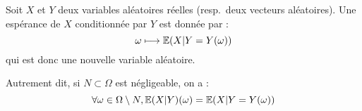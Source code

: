 \documentclass[../integ-proba.tex]{subfiles}
\begin{document}
    \begin{thm}
        Soit $X$ et $Y$ deux variables aléatoires réelles (resp.\ deux vecteurs aléatoires).
        Une espérance de $X$ conditionnée par $Y$ est donnée par :
        \begin{displaymath}
            \omega \longmapsto \mathbb{E}(X | Y = Y(\omega))
        \end{displaymath}
        qui est donc une nouvelle variable aléatoire.

        Autrement dit, si $N \subset \Omega$ est négligeable, on a :
        \begin{displaymath}
            \forall \omega \in \Omega \setminus N, \mathbb{E}(X | Y)(\omega) = \mathbb{E}(X | Y = Y(\omega))
        \end{displaymath}
    \end{thm}
\end{document}
